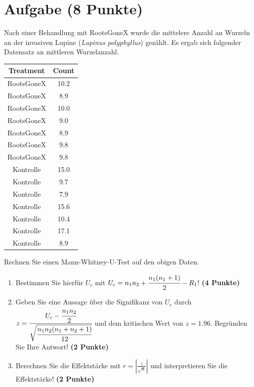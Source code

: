 \documentclass[a4paper, 10pt]{scrartcl}\usepackage[]{graphicx}\usepackage[]{color}
\newenvironment{knitrout}{}{} %
\begin{document}
\section{Aufgabe \hfill (8 Punkte)}



Nach einer Behandlung mit RootsGoneX wurde die mittelere Anzahl an Wurzeln
an der invasiven Lupine (\textit{Lupinus polyphyllus}) gez{\"a}hlt. Es ergab sich
folgender Datensatz an mittleren Wurzelanzahl.

\begin{knitrout}
\color{fgcolor}\begin{table}[!h]
\centering
\begin{tabular}{cc}
\toprule
Treatment & Count\\
\midrule
RootsGoneX & 10.2\\
RootsGoneX & 8.9\\
RootsGoneX & 10.0\\
RootsGoneX & 9.0\\
RootsGoneX & 8.9\\
\addlinespace
RootsGoneX & 9.8\\
RootsGoneX & 9.8\\
Kontrolle & 15.0\\
Kontrolle & 9.7\\
Kontrolle & 7.9\\
\addlinespace
Kontrolle & 15.6\\
Kontrolle & 10.4\\
Kontrolle & 17.1\\
Kontrolle & 8.9\\
\bottomrule
\end{tabular}
\end{table}

\end{knitrout}

Rechnen Sie einen Mann-Whitney-U-Test auf den obigen Daten.

\begin{enumerate}
\item Bestimmen Sie hierf{\"u}r $U_c$ mit $U_c = n_1n_2 +
  \cfrac{n_1(n_1+1)}{2}-R_1$! \textbf{(4 Punkte)} 
\item Geben Sie eine Aussage {\"u}ber die Signifikanz von $U_c$ durch $z =
  \cfrac{U_c - \cfrac{n_1n_2}{2}}{\sqrt{\cfrac{n_1n_2(n_1+n_2+1)}{12}}}$ und
  dem kritischen Wert von $z = 1.96$. Begr{\"u}nden Sie Ihre Antwort! \textbf{(2 Punkte)} 
\item Berechnen Sie die Effektst{\"a}rke mit $r = |\frac{z}{\sqrt{n}}| $ und
  interpretieren Sie die Effektst{\"a}rke! \textbf{(2 Punkte)} 
\end{enumerate} 
\clearpage
\end{document}
